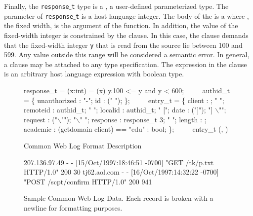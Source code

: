 Finally, the {\tt response$\_$t} type is a \Pfun, a user-defined
parameterized type.  The parameter of {\tt response$\_$t} is a host
language integer.  The body of the \Pfun{} is a 
where , the fixed width, is the argument of the function.  In
addition, the value of the fixed-width integer is constrained by the
\Pwhere{} clause.  In this case, the \Pwhere{} clause demands that
the fixed-width integer {\tt y} that is read from the source lie 
between 100 and 599.
Any value outside this range will be considered a semantic error.
In general, a \Pwhere{} clause may be attached to 
any type specification.  The expression in the \Pwhere{} clause
is an arbitrary host language expression with boolean type.


\begin{figure}
{\small
\begin{code}
response\_t =
  \Pfun(x:int) =
   (x) \Pwhere{} y.100 <= y and y < 600;
\(\qquad\)
authid\_t = \Punion{} \{
  unauthorized : "-";
  id           : \Pstring (" ");
\};
\(\qquad\)
entry\_t = \Pstruct{} \{
  client   : \Pip{};             " ";
  remoteid : authid\_t;        " ";
  localid  : authid\_t;        " [";
  date     : \Pdate("]");      "] \(\backslash\)"";
  request  : \Pstring("\(\backslash\)"");   "\(\backslash\)" ";
  response : response\_t 3;    " "; 
  length   : \Puint{};
  academic : \Pcompute 
             (getdomain client) == "edu" : bool;
\};
\(\qquad\)
entry\_t \Parray{}(\Peor, \Peof)
\end{code}

\caption{\ipads{} Common Web Log Format Description}
\label{fig:ipads-clf}
}
\end{figure}

\begin{figure}
{\small
\begin{code}
{}207.136.97.49 - - [15/Oct/1997:18:46:51 -0700] 
"GET /tk/p.txt HTTP/1.0" 200 30
tj62.aol.com - - [16/Oct/1997:14:32:22 -0700] 
"POST /scpt/confirm HTTP/1.0" 200 941
\end{code}
\caption{Sample Common Web Log Data. Each record is broken with a
  newline for formatting purposes.}
\label{fig:ipads-clf-data}
}
\end{figure}

